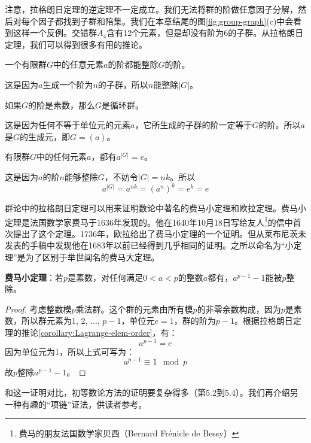 \documentclass[b5paper]{ctexart}
\begin{document}
注意，拉格朗日定理的逆定理不一定成立。我们无法将群的阶做任意因子分解，然后对每个因子都找到子群和陪集。我们在本章结尾的图\ref{fig:group-graph}(c)中会看到这样一个反例。交错群$A_4$含有12个元素，但是却没有阶为6的子群。从拉格朗日定理，我们可以得到很多有用的推论。

\begin{corollary}
一个有限群$G$中的任意元素$a$的阶都能整除$G$的阶。
\end{corollary}

这是因为$a$生成一个阶为$n$的子群，所以$n$能整除$|G|$。

\begin{corollary}
如果$G$的阶是素数，那么$G$是循环群。
\label{co:prime-order-group}
\end{corollary}

这是因为任何不等于单位元的元素$a$，它所生成的子群的阶一定等于$G$的阶。所以$a$是$G$的生成元，即$G = (a)$。

\begin{corollary}
有限群$G$中的任何元素$a$，都有$a^{|G|} = e$。
\label{corollary:Lagrange-elem-order}
\end{corollary}

这是因为$a$的阶$n$能够整除$G$，不妨令$|G| = nk$。所以
\[
a^{|G|} = a^{nk} = (a^n)^k = e^k = e
\]

群论中的拉格朗日定理可以用来证明数论中著名的费马小定理和欧拉定理。费马小定理是法国数学家费马于1636年发现的。他在1640年10月18日写给友人\footnote{费马的朋友法国数学家贝西（Bernard Frénicle de Bessy）}的信中首次提出了这个定理。1736年，欧拉给出了费马小定理的一个证明。但从莱布尼茨未发表的手稿中发现他在1683年以前已经得到几乎相同的证明。之所以命名为“小定理”是为了区别于举世闻名的费马大定理。

\begin{theorem}
\textbf{费马小定理}：若$p$是素数，对任何满足$0 < a < p$的整数$a$都有，$a^{p-1}-1$能被$p$整除。
\end{theorem}

\begin{proof}
考虑整数模$p$乘法群。这个群的元素由所有模$p$的非零余数构成，因为$p$是素数，所以群元素为1, 2, ..., $p-1$，单位元$e = 1$，群的阶为$p-1$。根据拉格朗日定理的推论\ref{corollary:Lagrange-elem-order}，有：
\[
a^{p-1} = e
\]
因为单位元为1，所以上式可写为：
\[
a^{p-1} \equiv 1 \mod p
\]
故$p$整除$a^{p-1} - 1$。
\end{proof}

和这一证明对比，初等数论方法的证明要复杂得多（\cite{StepanovRose15}第5.2到5.4）。我们再介绍另一种有趣的“项链”证法\cite{Wiki-FLT-proof}，供读者参考。
\end{document}
